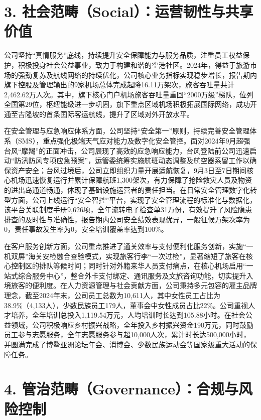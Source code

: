 \documentclass[a4paper,12pt]{article}
\begin{document}
\section{3. 社会范畴（Social）：运营韧性与共享价值}

公司坚持“真情服务”底线，持续提升安全保障能力与服务品质，注重员工权益保护，积极投身社会公益事业，致力于构建和谐的空港社区。2024年，得益于旅游市场的强劲复苏及航线网络的持续优化，公司核心业务指标实现稳步增长，报告期内旗下控股及管理输出的9家机场总体完成起降16.11万架次，旅客吞吐量共计2,462.62万人次。其中，旗下核心门户机场旅客吞吐量重回“2000万级”梯队，位列全国第29位，枢纽能级进一步巩固，旗下重点区域机场积极拓展国际网络，成功开通至吉隆坡的首条国际客运航线，提升了区域对外开放水平。

在安全管理与应急响应体系方面，公司坚持“安全第一”原则，持续完善安全管理体系（SMS），重点强化极端天气应对能力及数字化安全管控。面对2024年9月超强台风“摩羯”的正面冲击，公司展现了高效的应急响应能力，台风登陆前公司迅速启动“防汛防风专项应急预案”，运管委统筹实施航班动态调整及航空器系留工作以确保资产安全；台风过境后，公司立即组织力量开展适航恢复，9月3日至7日期间核心机场迅速恢复运行并累计保障航班1,300架次，有力保障了抢险救灾人员及物资的进出岛通道畅通，体现了基础设施运营者的责任担当。在日常安全管理数字化转型方面，公司上线运行“安全智控”平台，实现了安全管理流程的标准化与数据化，该平台关联制度手册9,626项，全年流转电子检查单31万份，有效提升了风险隐患排查的及时性与准确性，报告期内公司安全绩效表现优异，一般征候万架次率为0，责任事故发生率为0，安全培训覆盖率达到100\%。

在客户服务创新方面，公司重点推进了通关效率与支付便利化服务创新，实施“一机双屏”海关安检融合查验模式，实现旅客行李“一次过检”，显著缩短了旅客在核心控制区的排队等候时间；同时针对外籍来华人员支付痛点，在核心机场启用“一站式综合服务中心”，整合外卡支付绑定、通讯服务及文旅咨询功能，切实提升入境旅客的便利度。在人力资源管理与社会贡献方面，公司秉持多元包容的雇主品牌理念，截至2024年末，公司员工总数为10,611人，其中女性员工占比为38.9\%（4,133人），少数民族员工179人，董事会中女性成员占比22\%。公司重视人才培养，全年培训总投入1,119.54万元，人均培训时长达到105.88小时。在社会公益领域，公司积极响应乡村振兴战略，全年投入乡村振兴资金190万元，同时鼓励员工参与志愿服务，全年志愿服务参与超10,000人次，累计时长达500,000小时，并圆满完成了博鳌亚洲论坛年会、消博会、少数民族运动会等国家级重大活动的保障任务。

\section{4. 管治范畴（Governance）：合规与风险控制}
\end{document}
